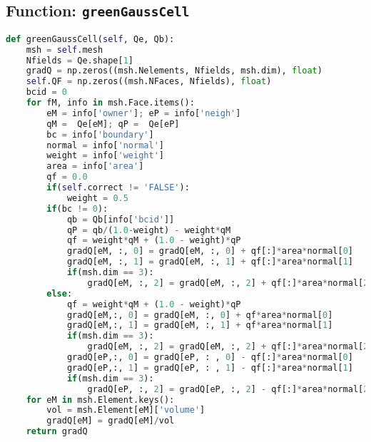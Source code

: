 \documentclass{article}
\begin{document}
\subsection*{Function: \texttt{greenGaussCell}}
\begin{lstlisting}[language=Python]
def greenGaussCell(self, Qe, Qb):
    msh = self.mesh
    Nfields = Qe.shape[1]
    gradQ = np.zeros((msh.Nelements, Nfields, msh.dim), float)
    self.QF = np.zeros((msh.NFaces, Nfields), float)
    bcid = 0
    for fM, info in msh.Face.items():
        eM = info['owner']; eP = info['neigh']
        qM =  Qe[eM]; qP =  Qe[eP]
        bc = info['boundary']
        normal = info['normal']
        weight = info['weight']
        area = info['area']
        qf = 0.0
        if(self.correct != 'FALSE'):
            weight = 0.5 
        if(bc != 0):
            qb = Qb[info['bcid']]
            qP = qb/(1.0-weight) - weight*qM 
            qf = weight*qM + (1.0 - weight)*qP
            gradQ[eM, :, 0] = gradQ[eM, :, 0] + qf[:]*area*normal[0]
            gradQ[eM, :, 1] = gradQ[eM, :, 1] + qf[:]*area*normal[1]
            if(msh.dim == 3):
                gradQ[eM, :, 2] = gradQ[eM, :, 2] + qf[:]*area*normal[2]
        else:
            qf = weight*qM + (1.0 - weight)*qP
            gradQ[eM,:, 0] = gradQ[eM, :, 0] + qf*area*normal[0]
            gradQ[eM,:, 1] = gradQ[eM, :, 1] + qf*area*normal[1]
            if(msh.dim == 3):
                gradQ[eM, :, 2] = gradQ[eM, :, 2] + qf[:]*area*normal[2]
            gradQ[eP,:, 0] = gradQ[eP, : , 0] - qf[:]*area*normal[0]
            gradQ[eP,:, 1] = gradQ[eP, : , 1] - qf[:]*area*normal[1]
            if(msh.dim == 3):
                gradQ[eP, :, 2] = gradQ[eP, :, 2] - qf[:]*area*normal[2]
    for eM in msh.Element.keys():
        vol = msh.Element[eM]['volume']
        gradQ[eM] = gradQ[eM]/vol
    return gradQ
\end{lstlisting}
\end{document}
